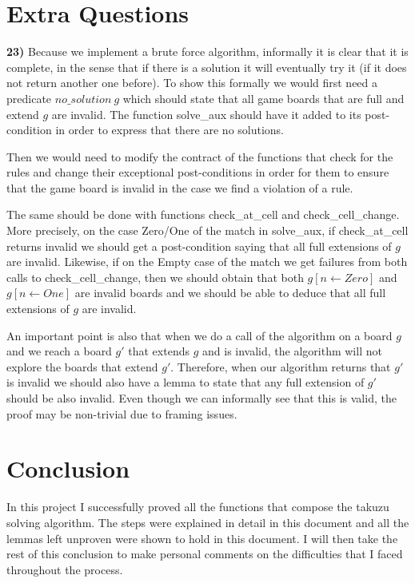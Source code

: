 \documentclass[]{StandardTemplate}
\begin{document}
\section{Extra Questions}
\label{sec:exq}

\textbf{23)} Because we implement a brute force algorithm, informally it is clear that it is complete, in the sense that if there is a solution it will eventually try it (if it does not return another one before). To show this formally we would first need a predicate $ no\_solution~g $ which should state that all game boards that are full and extend $ g $ are invalid. The function solve\_aux should have it added to its post-condition in order to express that there are no solutions.

Then we would need to modify the contract of the functions that check for the rules and change their exceptional post-conditions in order for them to ensure that the game board is invalid in the case we find a violation of a rule.

The same should be done with functions check\_at\_cell and check\_cell\_change. More precisely, on the case Zero/One of the match in solve\_aux, if check\_at\_cell returns invalid we should get a post-condition saying that all full extensions of $ g $ are invalid. Likewise, if on the Empty case of the match we get failures from both calls to check\_cell\_change, then we should obtain that both $ g[n \leftarrow Zero] $ and $ g[n \leftarrow One] $ are invalid boards and we should be able to deduce that all full extensions of $ g $ are invalid.

An important point is also that when we do a call of the algorithm on a board $ g $ and we reach a board $ g' $ that extends $ g $ and is invalid, the algorithm will not explore the boards that extend $ g' $. Therefore, when our algorithm returns that $ g' $ is invalid we should also have a lemma to state that any full extension of $ g' $ should be also invalid. Even though we can informally see that this is valid, the proof may be non-trivial due to framing issues. 

\section{Conclusion}
\label{sec:conc}

In this project I successfully proved all the functions that compose the takuzu solving algorithm. The steps were explained in detail in this document and all the lemmas left unproven were shown to hold in this document. I will then take the rest of this conclusion to make personal comments on the difficulties that I faced throughout the process.
\end{document}
